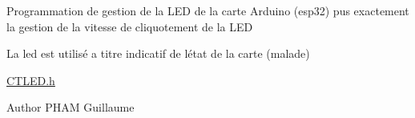 Programmation de gestion de la LED de la carte Arduino (esp32) pus exactement la gestion de la vitesse de cliquotement de la LED

La led est utilisé a titre indicatif de l\textquotesingle{}état de la carte (malade)

\mbox{\hyperlink{_c_t_l_e_d_8h}{CTLED.\+h}} \begin{DoxyAuthor}{Author}
PHAM Guillaume 
\end{DoxyAuthor}
